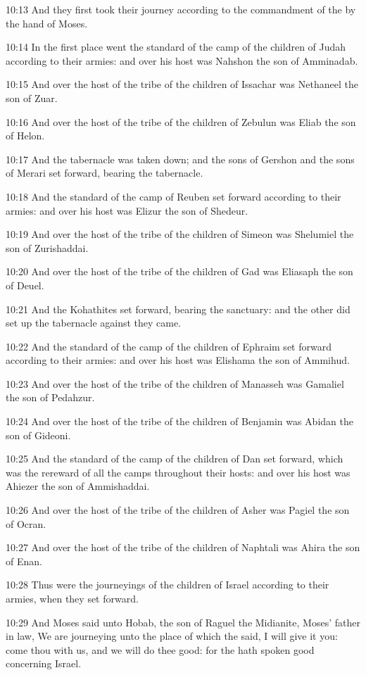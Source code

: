 10:13 And they first took their journey according to the commandment of the \LORD by the hand of Moses.

10:14 In the first place went the standard of the camp of the children of Judah according to their armies: and over his host was Nahshon the son of Amminadab.

10:15 And over the host of the tribe of the children of Issachar was Nethaneel the son of Zuar.

10:16 And over the host of the tribe of the children of Zebulun was Eliab the son of Helon.

10:17 And the tabernacle was taken down; and the sons of Gershon and the sons of Merari set forward, bearing the tabernacle.

10:18 And the standard of the camp of Reuben set forward according to their armies: and over his host was Elizur the son of Shedeur.

10:19 And over the host of the tribe of the children of Simeon was Shelumiel the son of Zurishaddai.

10:20 And over the host of the tribe of the children of Gad was Eliasaph the son of Deuel.

10:21 And the Kohathites set forward, bearing the sanctuary: and the other did set up the tabernacle against they came.

10:22 And the standard of the camp of the children of Ephraim set forward according to their armies: and over his host was Elishama the son of Ammihud.

10:23 And over the host of the tribe of the children of Manasseh was Gamaliel the son of Pedahzur.

10:24 And over the host of the tribe of the children of Benjamin was Abidan the son of Gideoni.

10:25 And the standard of the camp of the children of Dan set forward, which was the rereward of all the camps throughout their hosts: and over his host was Ahiezer the son of Ammishaddai.

10:26 And over the host of the tribe of the children of Asher was Pagiel the son of Ocran.

10:27 And over the host of the tribe of the children of Naphtali was Ahira the son of Enan.

10:28 Thus were the journeyings of the children of Israel according to their armies, when they set forward.

10:29 And Moses said unto Hobab, the son of Raguel the Midianite, Moses' father in law, We are journeying unto the place of which the \LORD said, I will give it you: come thou with us, and we will do thee good: for the \LORD hath spoken good concerning Israel.

